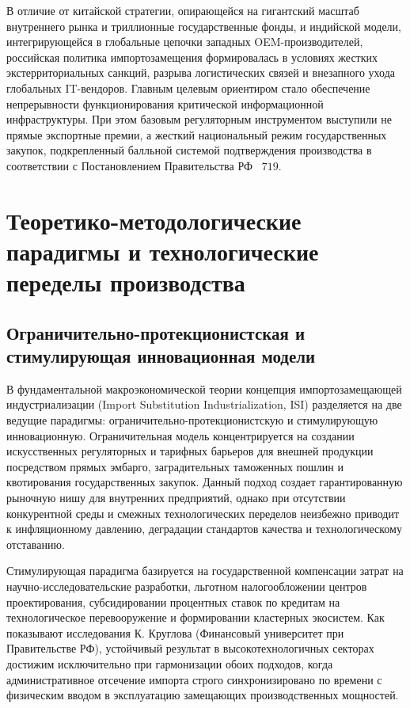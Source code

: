 \documentclass[12pt,a4paper]{article}
\begin{document}
В отличие от китайской стратегии, опирающейся на гигантский 
масштаб внутреннего рынка и триллионные государственные фонды, и 
индийской модели, интегрирующейся в глобальные цепочки западных 
OEM-производителей, российская политика импортозамещения формировалась 
в условиях жестких экстерриториальных санкций, разрыва логистических 
связей и внезапного ухода глобальных IT-вендоров. Главным целевым 
ориентиром стало обеспечение непрерывности функционирования 
критической информационной инфраструктуры. При этом базовым 
регуляторным инструментом выступили не прямые экспортные премии, а 
жесткий национальный режим государственных закупок, подкрепленный 
балльной системой подтверждения производства в соответствии с 
Постановлением Правительства РФ \textnumero~$719$.

\section{Теоретико-методологические парадигмы и технологические 
переделы производства}

\subsection{Ограничительно-протекционистская и стимулирующая 
инновационная модели}

В фундаментальной макроэкономической теории концепция 
импортозамещающей индустриализации (Import Substitution 
Industrialization, ISI) разделяется на две ведущие парадигмы: 
ограничительно-протекционистскую и стимулирующую инновационную. 
Ограничительная модель концентрируется на создании искусственных 
регуляторных и тарифных барьеров для внешней продукции посредством 
прямых эмбарго, заградительных таможенных пошлин и квотирования 
государственных закупок. Данный подход создает гарантированную 
рыночную нишу для внутренних предприятий, однако при отсутствии 
конкурентной среды и смежных технологических переделов неизбежно 
приводит к инфляционному давлению, деградации стандартов качества 
и технологическому отставанию.

Стимулирующая парадигма базируется на государственной компенсации 
затрат на научно-исследовательские разработки, льготном 
налогообложении центров проектирования, субсидировании процентных 
ставок по кредитам на технологическое перевооружение и формировании 
кластерных экосистем. Как показывают исследования К. Круглова 
(Финансовый университет при Правительстве РФ), устойчивый результат 
в высокотехнологичных секторах достижим исключительно при гармонизации 
обоих подходов, когда административное отсечение импорта строго 
синхронизировано по времени с физическим вводом в эксплуатацию 
замещающих производственных мощностей.
\end{document}
